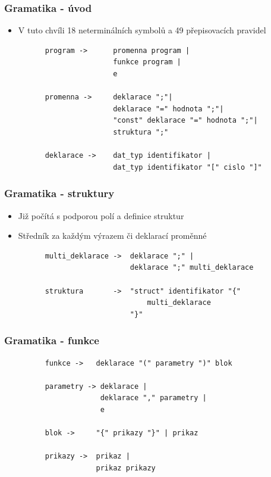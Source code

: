 \documentclass[xcolor=dvipsnames]{beamer}
\begin{document}
\begin{frame}[fragile]
\frametitle{\textbf{Gramatika - úvod}}
    \begin{itemize}
        \item V tuto chvíli 18 neterminálních symbolů a 49 přepisovacích pravidel
    \end{itemize}
    \begin{figure}
        \centering
        \begin{verbatim}
    program ->      promenna program |
                    funkce program |
                    e

    promenna ->     deklarace ";"|
                    deklarace "=" hodnota ";"|
                    "const" deklarace "=" hodnota ";"|
                    struktura ";"

    deklarace ->    dat_typ identifikator |
                    dat_typ identifikator "[" cislo "]"
        \end{verbatim}
    \end{figure}
\end{frame}

\begin{frame}[fragile]
\frametitle{\textbf{Gramatika - struktury}}
    \begin{itemize}
        \item Již počítá s podporou polí a definice struktur
        \item Středník za každým výrazem či deklarací proměnné
    \end{itemize}
    \begin{figure}
        \centering
        \begin{verbatim} 
    multi_deklarace ->  deklarace ";" | 
                        deklarace ";" multi_deklarace
    
    struktura       ->  "struct" identifikator "{" 
                            multi_deklarace 
                        "}" 
        \end{verbatim}
    \end{figure}
\end{frame}

\begin{frame}[fragile]
\frametitle{\textbf{Gramatika - funkce}}
    \begin{figure}
        \centering
        \begin{verbatim}
    funkce ->   deklarace "(" parametry ")" blok

    parametry -> deklarace |
                 deklarace "," parametry |
                 e
    
    blok ->     "{" prikazy "}" | prikaz
    
    prikazy ->  prikaz |
                prikaz prikazy
        \end{verbatim}
    \end{figure}
\end{frame}
\end{document}
